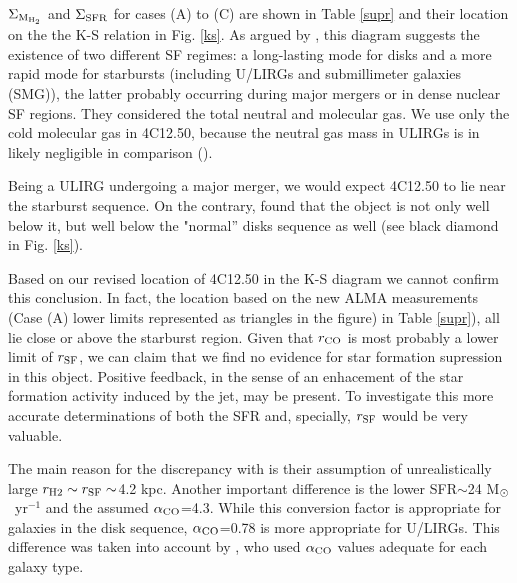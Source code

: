 \documentclass{aa}
\newcommand{\msun}{M$_{\rm \odot}$~}
\begin{document}
  $\Sigma_{\rm M_{H_2}}$ and  $\Sigma_{\rm SFR}$  for cases (A) to (C) are shown in Table \ref{supr} and their location  on the the K-S relation in Fig. \ref{ks}. As argued by \cite{Daddi2010a}, this diagram suggests the
existence of two different SF regimes: a long-lasting mode for disks and a more rapid mode for starbursts (including U/LIRGs and submillimeter galaxies (SMG)), the latter probably occurring during major mergers or in dense nuclear SF regions. They considered the total neutral and molecular gas. We use only the cold molecular gas in 4C12.50, because the neutral gas  mass in ULIRGs is in likely negligible  in comparison  (\citealt{Daddi2010b}). 

Being a ULIRG undergoing a major merger, we would expect 4C12.50 to lie  near  the starburst sequence.  On the contrary, \cite{Lanz2016} found that the object is not only well below  it, but well below the "normal'' disks sequence as well (see black diamond in Fig. \ref{ks}). 

Based on our revised location of 4C12.50 in the K-S diagram we 
cannot confirm this conclusion. In fact, the location based on the new  ALMA measurements (Case (A) lower limits represented as triangles in the figure) in Table \ref{supr}),   all lie close or above the starburst region.  Given that $r_{\rm CO}$ is most probably a lower limit of $r_{\rm SF}$, we can  claim that we find no evidence for star formation supression in this object. Positive feedback, in the sense of an enhacement of the star formation activity induced by the jet, may be present. To investigate this    more accurate determinations of both the SFR and, specially,  $r_{\rm SF}$ would be very valuable.


The main reason for the discrepancy with \cite{Lanz2016} is their assumption of  unrealistically large $r_{\rm H2} \sim r_{\rm SF}\sim$4.2 kpc. Another important difference is the lower SFR$\sim$24 \msun yr$^{-1}$ and the assumed $\alpha_{\rm CO}$=4.3. While this  conversion factor is appropriate for galaxies in the disk sequence, $\alpha_{\rm CO}$=0.78 is more appropriate for U/LIRGs. This difference was taken into account by \cite{Daddi2010a}, who used $\alpha_{\rm CO}$ values adequate for each galaxy type.  
\end{document}

